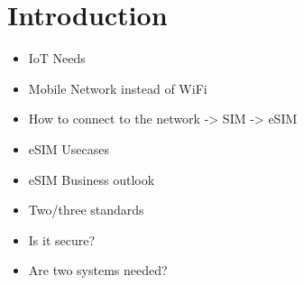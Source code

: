 
\chapter{Introduction}\label{chapter:introduction}
\begin{itemize}
    \item IoT Needs
    \item Mobile Network instead of WiFi
    \item How to connect to the network -> SIM -> eSIM
    \item eSIM Usecases
    \item eSIM Business outlook
    \item Two/three standards
    \item Is it secure?
    \item Are two systems needed?
\end{itemize}
